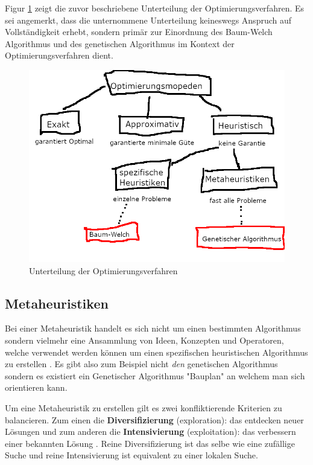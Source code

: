 Figur \ref{fig:optimierungsverfahren} zeigt die zuvor beschriebene Unterteilung der Optimierungsverfahren. Es sei angemerkt, dass die unternommene Unterteilung keineswegs Anspruch auf Vollständigkeit erhebt, sondern primär zur Einordnung des Baum-Welch Algorithmus und des genetischen Algorithmus im Kontext der Optimierungsverfahren dient.
\begin{figure}[h!]
    \includegraphics[scale=1.0]{images/Unterteilung_Optimierungsverfahren.png}
    \caption{Unterteilung der Optimierungsverfahren}
    \label{fig:optimierungsverfahren}
\end{figure}

\subsection{Metaheuristiken}
Bei einer Metaheuristik handelt es sich nicht um einen bestimmten Algorithmus sondern vielmehr eine Ansammlung von Ideen, Konzepten und Operatoren, welche verwendet werden können um einen spezifischen heuristischen Algorithmus zu erstellen \cite*{MetaheuristicsExposed}. Es gibt also zum Beispiel nicht \textit{den} genetischen Algorithmus sondern es existiert ein Genetischer Algorithmus "Bauplan" an welchem man sich orientieren kann.

Um eine Metaheuristik zu erstellen gilt es zwei konfliktierende Kriterien zu balancieren. Zum einen die \textbf{Diversifizierung} (exploration): das entdecken neuer Lösungen und zum anderen die \textbf{Intensivierung} (exploitation): das verbessern einer bekannten Lösung \cite*{MetaheuristicsEGT}. Reine Diversifizierung ist das selbe wie eine zufällige Suche und reine Intensivierung ist equivalent zu einer lokalen Suche.


